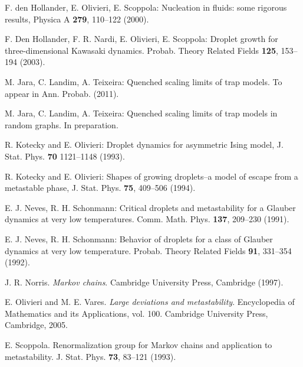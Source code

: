 \documentclass[reqno]{amsart}
\begin{document}
\begin{thebibliography}{99}
 F. den Hollander, E. Olivieri, E. Scoppola: Nucleation
  in fluids: some rigorous results, Physica A {\bf 279}, 110--122
  (2000).

 F. Den Hollander, F. R. Nardi, E.  Olivieri, E.
  Scoppola: Droplet growth for three-dimensional Kawasaki dynamics.
  Probab. Theory Related Fields {\bf 125}, 153--194 (2003).

 M. Jara, C. Landim, A. Teixeira: Quenched scaling
  limits of trap models. To appear in Ann. Probab. (2011).

 M. Jara, C. Landim, A. Teixeira: Quenched scaling
  limits of trap models in random graphs. In preparation.

 R. Kotecky and E. Olivieri: Droplet dynamics for
  asymmetric Ising model, J. Stat. Phys. {\bf 70}
  1121--1148 (1993).

 R. Kotecky and E. Olivieri: Shapes of growing
  droplets--a model of escape from a metastable phase,
  J. Stat. Phys. {\bf 75}, 409--506 (1994).

 E. J. Neves, R. H. Schonmann: Critical droplets and
  metastability for a Glauber dynamics at very low temperatures. Comm.
  Math. Phys. {\bf 137}, 209--230 (1991).

 E. J. Neves, R. H. Schonmann: Behavior of droplets for a
  class of Glauber dynamics at very low temperature.  Probab. Theory
  Related Fields {\bf 91}, 331--354 (1992).

 J. R. Norris. {\em Markov chains}. Cambridge University
  Press, Cambridge (1997).

 E. Olivieri and M. E. Vares. {\em Large deviations and
    metastability}. Encyclopedia of Mathematics and its Applications,
  vol. 100. Cambridge University Press, Cambridge, 2005.

 E. Scoppola. Renormalization group for Markov chains and
  application to metastability.  J. Stat. Phys. {\bf 73}, 83--121
  (1993). 

\end{thebibliography}
\end{document}

